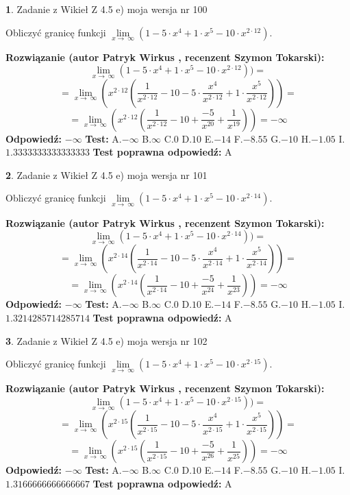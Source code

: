 \documentclass[12pt, a4paper]{article}
\theoremstyle{definition} %
\newtheorem{zad}{}
\newcommand{\zadStart}[1]{\begin{zad}#1\newline}
\newcommand{\zadStop}{\end{zad}}
\newcommand{\rozwStart}[2]{\noindent \textbf{Rozwiązanie (autor #1 , recenzent #2): }\newline}
\newcommand{\rozwStop}{\newline}
\newcommand{\odpStart}{\noindent \textbf{Odpowiedź:}\newline}
\newcommand{\odpStop}{\newline}
\newcommand{\testStart}{\noindent \textbf{Test:}\newline}
\newcommand{\testStop}{\newline}
\newcommand{\kluczStart}{\noindent \textbf{Test poprawna odpowiedź:}\newline}
\newcommand{\kluczStop}{\newline}
\begin{document}
\zadStart{Zadanie z Wikieł Z 4.5 e) moja wersja nr 100}


Obliczyć granicę funkcji  $\lim\limits_{x\to\ \infty}(1 - 5 \cdot x^{4}+1 \cdot x^{5}- 10 \cdot x^{2\cdot12})$.
\zadStop
\rozwStart{Patryk Wirkus}{Szymon Tokarski}
$$\lim\limits_{x\to\ \infty}(1 - 5 \cdot x^{4}+1 \cdot x^{5}- 10 \cdot x^{2\cdot12}))=$$
$$=\lim\limits_{x\to\ \infty}(x^{2\cdot12}(\frac{1}{x^{2\cdot12}}-10 -5 \cdot \frac{x^{4}}{x^{2\cdot12}}+1 \cdot \frac{x^{5}}{x^{2\cdot12}}))=$$
$$=\lim\limits_{x\to\ \infty}(x^{2\cdot12}(\frac{1}{x^{2\cdot12}}-10 + \frac{-5}{x^{20}}+ \frac{1}{x^{19}}))=-\infty$$
\rozwStop
\odpStart
$-\infty$
\odpStop
\testStart
A.$-\infty$ B.$\infty$ C.$0$ D.$10$ E.$-14$
F.$-8.55$ G.$-10$
H.$-1.05$
I.$1.3333333333333333$
\testStop
\kluczStart
A
\kluczStop



\zadStart{Zadanie z Wikieł Z 4.5 e) moja wersja nr 101}


Obliczyć granicę funkcji  $\lim\limits_{x\to\ \infty}(1 - 5 \cdot x^{4}+1 \cdot x^{5}- 10 \cdot x^{2\cdot14})$.
\zadStop
\rozwStart{Patryk Wirkus}{Szymon Tokarski}
$$\lim\limits_{x\to\ \infty}(1 - 5 \cdot x^{4}+1 \cdot x^{5}- 10 \cdot x^{2\cdot14}))=$$
$$=\lim\limits_{x\to\ \infty}(x^{2\cdot14}(\frac{1}{x^{2\cdot14}}-10 -5 \cdot \frac{x^{4}}{x^{2\cdot14}}+1 \cdot \frac{x^{5}}{x^{2\cdot14}}))=$$
$$=\lim\limits_{x\to\ \infty}(x^{2\cdot14}(\frac{1}{x^{2\cdot14}}-10 + \frac{-5}{x^{24}}+ \frac{1}{x^{23}}))=-\infty$$
\rozwStop
\odpStart
$-\infty$
\odpStop
\testStart
A.$-\infty$ B.$\infty$ C.$0$ D.$10$ E.$-14$
F.$-8.55$ G.$-10$
H.$-1.05$
I.$1.3214285714285714$
\testStop
\kluczStart
A
\kluczStop



\zadStart{Zadanie z Wikieł Z 4.5 e) moja wersja nr 102}


Obliczyć granicę funkcji  $\lim\limits_{x\to\ \infty}(1 - 5 \cdot x^{4}+1 \cdot x^{5}- 10 \cdot x^{2\cdot15})$.
\zadStop
\rozwStart{Patryk Wirkus}{Szymon Tokarski}
$$\lim\limits_{x\to\ \infty}(1 - 5 \cdot x^{4}+1 \cdot x^{5}- 10 \cdot x^{2\cdot15}))=$$
$$=\lim\limits_{x\to\ \infty}(x^{2\cdot15}(\frac{1}{x^{2\cdot15}}-10 -5 \cdot \frac{x^{4}}{x^{2\cdot15}}+1 \cdot \frac{x^{5}}{x^{2\cdot15}}))=$$
$$=\lim\limits_{x\to\ \infty}(x^{2\cdot15}(\frac{1}{x^{2\cdot15}}-10 + \frac{-5}{x^{26}}+ \frac{1}{x^{25}}))=-\infty$$
\rozwStop
\odpStart
$-\infty$
\odpStop
\testStart
A.$-\infty$ B.$\infty$ C.$0$ D.$10$ E.$-14$
F.$-8.55$ G.$-10$
H.$-1.05$
I.$1.3166666666666667$
\testStop
\kluczStart
A
\kluczStop
\end{document}
